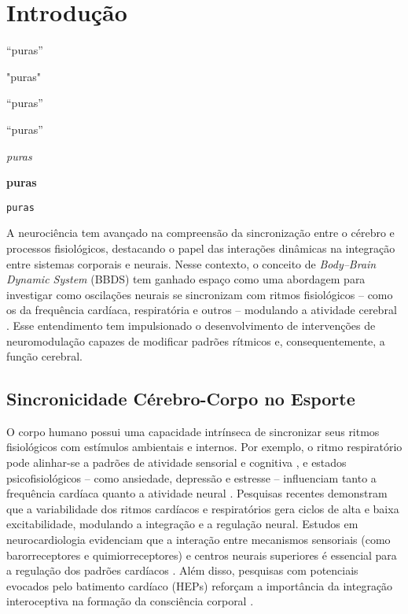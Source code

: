 \chapter{Introdução}
\label{chap:introducao}

``puras''

"puras"

\textquotedblleft puras\textquotedblright

\enquote{puras}


\emph{puras}

\textbf{puras}

\texttt{puras}



A neurociência tem avançado na compreensão da sincronização entre o cérebro e processos fisiológicos, destacando o papel das interações dinâmicas na integração entre sistemas corporais e neurais. Nesse contexto, o conceito de \textit{Body–Brain Dynamic System} (BBDS) tem ganhado espaço como uma abordagem para investigar como oscilações neurais se sincronizam com ritmos fisiológicos – como os da frequência cardíaca, respiratória e outros – modulando a atividade cerebral \cite{criscuolo2022cognition, cohen2017where}. Esse entendimento tem impulsionado o desenvolvimento de intervenções de neuromodulação capazes de modificar padrões rítmicos e, consequentemente, a função cerebral.

\section{Sincronicidade Cérebro-Corpo no Esporte}
O corpo humano possui uma capacidade intrínseca de sincronizar seus ritmos fisiológicos com estímulos ambientais e internos. Por exemplo, o ritmo respiratório pode alinhar-se a padrões de atividade sensorial e cognitiva \cite{haas1985effects}, e estados psicofisiológicos – como ansiedade, depressão e estresse – influenciam tanto a frequência cardíaca quanto a atividade neural \cite{criscuolo2022cognition}. Pesquisas recentes demonstram que a variabilidade dos ritmos cardíacos e respiratórios gera ciclos de alta e baixa excitabilidade, modulando a integração e a regulação neural. Estudos em neurocardiologia evidenciam que a interação entre mecanismos sensoriais (como barorreceptores e quimiorreceptores) e centros neurais superiores é essencial para a regulação dos padrões cardíacos \cite{marcondes2024linguagem}. Além disso, pesquisas com potenciais evocados pelo batimento cardíaco (HEPs) reforçam a importância da integração interoceptiva na formação da consciência corporal \cite{park2018neural, banelli2020skipping, mackinnon2013utilizing}.

